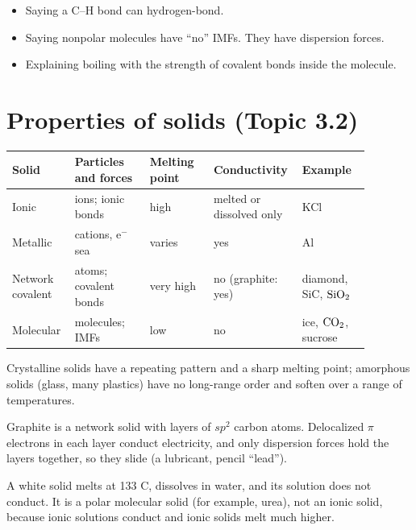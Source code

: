 \documentclass[11pt]{article}
\begin{document}
\errorsh
\begin{itemize}
\item Saying a C--H bond can hydrogen-bond.
\item Saying nonpolar molecules have ``no'' IMFs. They have dispersion forces.
\item Explaining boiling with the strength of covalent bonds inside the molecule.
\end{itemize}

\section{Properties of solids (Topic 3.2)}\label{t:3.2}
\begin{center}
\begin{tabular}{p{0.15\linewidth}p{0.2\linewidth}p{0.17\linewidth}p{0.18\linewidth}p{0.18\linewidth}}\toprule
Solid & Particles and forces & Melting point & Conductivity & Example \\ \midrule
Ionic & ions; ionic bonds & high & melted or dissolved only & KCl \\
Metallic & cations, e$^-$ sea & varies & yes & Al \\
Network covalent & atoms; covalent bonds & very high & no (graphite: yes) & diamond, SiC, $\ce{SiO2}$ \\
Molecular & molecules; IMFs & low & no & ice, $\ce{CO2}$, sucrose \\ \bottomrule
\end{tabular}
\end{center}
Crystalline solids have a repeating pattern and a sharp melting point; amorphous solids (glass, many plastics) have no long-range order and soften over a range of temperatures.

Graphite is a network solid with layers of $sp^2$ carbon atoms. Delocalized $\pi$ electrons in each layer conduct electricity, and only dispersion forces hold the layers together, so they slide (a lubricant, pencil ``lead'').

 A white solid melts at 133 \textdegree C, dissolves in water, and its solution does not conduct. It is a polar molecular solid (for example, urea), not an ionic solid, because ionic solutions conduct and ionic solids melt much higher.
\end{document}
